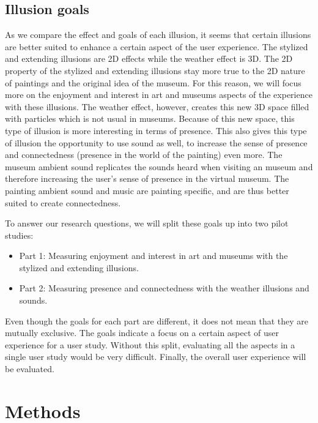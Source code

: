 \documentclass[a4paper]{article}
\begin{document}
\subsection{Illusion goals}\label{sec:illusiongoals}
As we compare the effect and goals of each illusion, it seems that certain illusions are better suited to enhance a certain aspect of the user experience. The stylized and extending illusions are 2D effects while the weather effect is 3D. The 2D property of the stylized and extending illusions stay more true to the 2D nature of paintings and the original idea of the museum. For this reason, we will focus more on the enjoyment and interest in art and museums aspects of the experience with these illusions. 
The weather effect, however, creates this new 3D space filled with particles which is not usual in museums. Because of this new space, this type of illusion is more interesting in terms of presence. This also gives this type of illusion the opportunity to use sound as well, to increase the sense of presence and connectedness (presence in the world of the painting) even more. The museum ambient sound replicates the sounds heard when visiting an museum and therefore increasing the user's sense of presence in the virtual museum. The painting ambient sound and music are painting specific, and are thus better suited to create connectedness. 

To answer our research questions, we will split these goals up into two pilot studies:
\begin{itemize}
\item{Part 1:} Measuring enjoyment and interest in art and museums with the stylized and extending illusions.
\item{Part 2:} Measuring presence and connectedness with the weather illusions and sounds.
\end{itemize}
Even though the goals for each part are different, it does not mean that they are mutually exclusive. The goals indicate a focus on a certain aspect of user experience for a user study. Without this split, evaluating all the aspects in a single user study would be very difficult. Finally, the overall user experience will be evaluated.

\section{Methods} \label{sec:methods}
\end{document}
